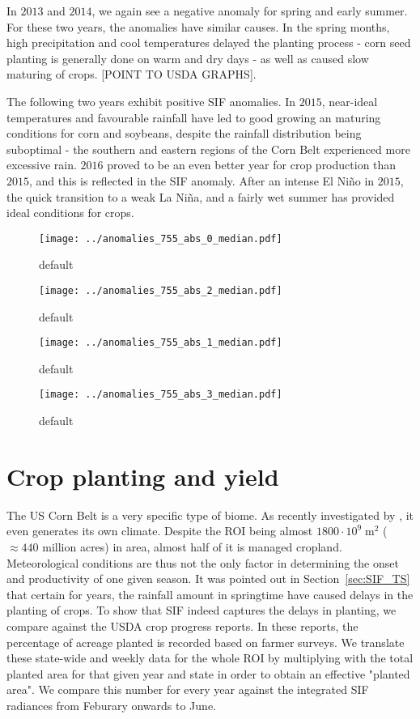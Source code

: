 \documentclass[preprint, a4paper, 10pt, times]{elsarticle}
\begin{document}
In $2013$ and $2014$, we again see a negative anomaly for spring and early summer. For these two years, the anomalies have similar causes. In the spring months, high precipitation and cool temperatures delayed the planting process - corn seed planting is generally done on warm and dry days - as well as caused slow maturing of crops. [POINT TO USDA GRAPHS].

The following two years exhibit positive SIF anomalies. In $2015$, near-ideal temperatures and favourable rainfall have led to good growing an maturing conditions for corn and soybeans, despite the rainfall distribution being suboptimal - the southern and eastern regions of the Corn Belt experienced more excessive rain. $2016$ proved to be an even better year for crop production than $2015$, and this is reflected in the SIF anomaly. After an intense El Ni\~no in $2015$, the quick transition to a weak La Ni\~na, and a fairly wet summer has provided ideal conditions for crops.


\begin{figure}[htbp]
\centering
\texttt{[image: ../anomalies\_755\_abs\_0\_median.pdf]}
\caption{default}
\label{fig:anomalies_0}
\end{figure}

\begin{figure}[htbp]
\centering
\texttt{[image: ../anomalies\_755\_abs\_2\_median.pdf]}
\caption{default}
\label{fig:anomalies_2}
\end{figure}


\begin{figure}[htbp]
\centering
\texttt{[image: ../anomalies\_755\_abs\_1\_median.pdf]}
\caption{default}
\label{fig:anomalies_1}
\end{figure}

\begin{figure}[htbp]
\centering
\texttt{[image: ../anomalies\_755\_abs\_3\_median.pdf]}
\caption{default}
\label{fig:anomalies_3}
\end{figure}

\section{Crop planting and yield}

The US Corn Belt is a very specific type of biome. As recently investigated by \citet{Alter2017}, it even generates its own climate. Despite the ROI being almost $1800 \cdot 10^9\;\mathrm{m}^2$ ($\approx 440$ million acres) in area, almost half of it is managed cropland. Meteorological conditions are thus not the only factor in determining the onset and productivity of one given season. It was pointed out in Section~\ref{sec:SIF_TS} that certain for years, the rainfall amount in springtime have caused delays in the planting of crops. To show that SIF indeed captures the delays in planting, we compare against the USDA crop progress reports. In these reports, the percentage of acreage planted is recorded based on farmer surveys. We translate these state-wide and weekly data for the whole ROI by multiplying with the total planted area for that given year and state in order to obtain an effective "planted area". We compare this number for every year against the integrated SIF radiances from Feburary onwards to June.
\end{document}
